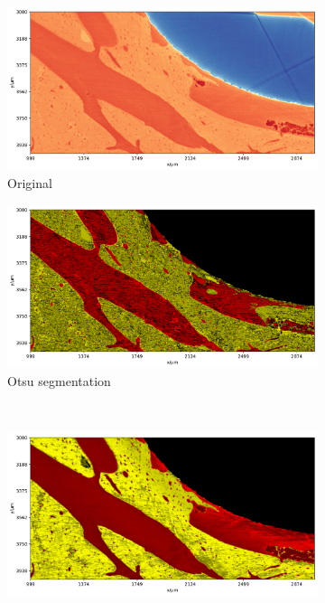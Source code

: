 \begin{figure}
  \centering
    \begin{subfigure}{0.5\textwidth}
      \centering
      \includegraphics[width=\linewidth]{generated/770c_pag_segmented_yx_raw.pdf}
      \caption{Original}
    \end{subfigure}%
    \begin{subfigure}{0.5\textwidth}
      \centering
      \includegraphics[width=\linewidth]{generated/770c_pag_global_yx_otsu.pdf}
      \caption{Otsu segmentation}
    \end{subfigure}
    \\
    \begin{subfigure}{0.5\textwidth}
      \centering
      \includegraphics[width=\linewidth]{generated/770c_pag_segmented_yx_colored.pdf}

\end{subfigure}
\end{figure}
